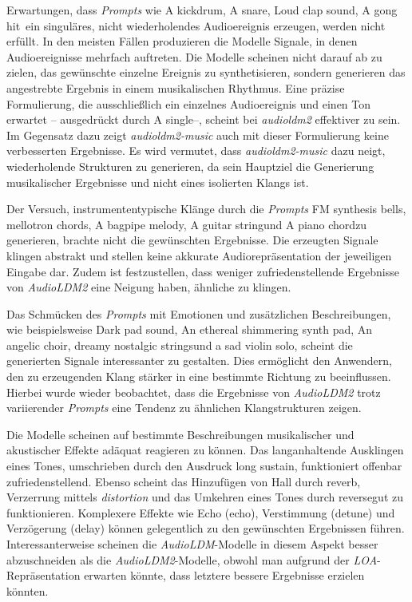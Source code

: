 \documentclass[
  a4paper,  %
  twoside,  %
  bibliography=totoc,
  headsepline,
  cleardoublepage=empty,
  parskip=half,
  draft=false
]{scrbook}
\begin{document}
{Erwartungen, dass \emph{Prompts} wie \glqq A kickdrum\grqq, \glqq A snare\grqq, \glqq Loud clap sound\grqq, \glqq A gong hit\grqq \, ein singuläres, nicht wiederholendes Audioereignis erzeugen, werden nicht erfüllt. In den meisten Fällen produzieren die Modelle Signale, in denen Audioereignisse mehrfach auftreten. Die Modelle scheinen nicht darauf ab zu zielen, das gewünschte einzelne Ereignis zu synthetisieren, sondern generieren das angestrebte Ergebnis in einem musikalischen Rhythmus. Eine präzise Formulierung, die ausschließlich ein einzelnes Audioereignis und einen Ton erwartet – ausgedrückt durch \glqq A single\grqq –, scheint bei \emph{audioldm2} \cite{noauthor_cvsspaudioldm2_nodate} effektiver zu sein. Im Gegensatz dazu zeigt \emph{audioldm2-music} \cite{noauthor_cvsspaudioldm2-music_nodate} auch mit dieser Formulierung keine verbesserten Ergebnisse. Es wird vermutet, dass \emph{audioldm2-music} \cite{noauthor_cvsspaudioldm2-music_nodate} dazu neigt, wiederholende Strukturen zu generieren, da sein Hauptziel die Generierung musikalischer Ergebnisse und nicht eines isolierten Klangs ist.

Der Versuch, instrumententypische Klänge durch die \emph{Prompts} \glqq FM synthesis bells\grqq, \glqq mellotron chords\grqq, \glqq A bagpipe melody\grqq, \glqq A guitar string\grqq und \glqq A piano chord\grqq zu generieren, brachte nicht die gewünschten Ergebnisse. Die erzeugten Signale klingen abstrakt und stellen keine akkurate Audiorepräsentation der jeweiligen Eingabe dar. Zudem ist festzustellen, dass weniger zufriedenstellende Ergebnisse von \emph{AudioLDM2} eine Neigung haben, ähnliche zu klingen.

Das Schmücken des \emph{Prompts} mit Emotionen und zusätzlichen Beschreibungen, wie beispielsweise \glqq Dark pad sound\grqq, \glqq An ethereal shimmering synth pad\grqq, \glqq An angelic choir\grqq, \glqq dreamy nostalgic strings\grqq und \glqq a sad violin solo\grqq, scheint die generierten Signale interessanter zu gestalten. Dies ermöglicht den Anwendern, den zu erzeugenden Klang stärker in eine bestimmte Richtung zu beeinflussen. Hierbei wurde wieder beobachtet, dass die Ergebnisse von \emph{AudioLDM2} trotz variierender \emph{Prompts} eine Tendenz zu ähnlichen Klangstrukturen zeigen.

Die Modelle scheinen auf bestimmte Beschreibungen musikalischer und akustischer Effekte adäquat reagieren zu können. Das langanhaltende Ausklingen eines Tones, umschrieben durch den Ausdruck \glqq long sustain\grqq, funktioniert offenbar zufriedenstellend. Ebenso scheint das Hinzufügen von Hall durch \glqq reverb\grqq, Verzerrung mittels \emph{distortion} und das Umkehren eines Tones durch \glqq reverse\grqq gut zu funktionieren. Komplexere Effekte wie Echo (\glqq echo\grqq), Verstimmung (\glqq detune\grqq) und Verzögerung (\glqq delay\grqq) können gelegentlich zu den gewünschten Ergebnissen führen. Interessanterweise scheinen die \emph{AudioLDM}-Modelle in diesem Aspekt besser abzuschneiden als die \emph{AudioLDM2}-Modelle, obwohl man aufgrund der \emph{LOA}-Repräsentation erwarten könnte, dass letztere bessere Ergebnisse erzielen könnten.

}
\end{document}
